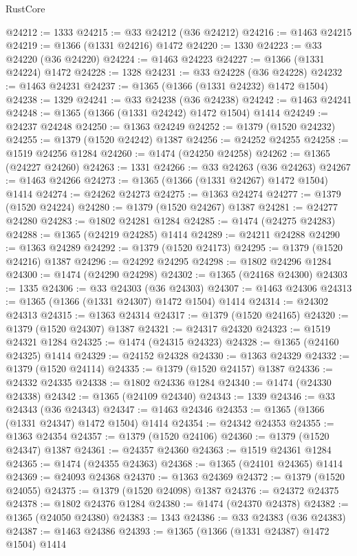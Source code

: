 \begin{lexlean}{RustCore}
\begin{coremodule}
@24212 := 1333
@24215 := @33 @24212 (@36 @24212)
@24216 := @1463 @24215
@24219 := @1366 (@1331 @24216) @1472
@24220 := 1330
@24223 := @33 @24220 (@36 @24220)
@24224 := @1463 @24223
@24227 := @1366 (@1331 @24224) @1472
@24228 := 1328
@24231 := @33 @24228 (@36 @24228)
@24232 := @1463 @24231
@24237 := @1365 (@1366 (@1331 @24232) @1472 @1504)
@24238 := 1329
@24241 := @33 @24238 (@36 @24238)
@24242 := @1463 @24241
@24248 := @1365 (@1366 (@1331 @24242) @1472 @1504) @1414
@24249 := @24237 @24248
@24250 := @1363 @24249
@24252 := @1379 (@1520 @24232)
@24255 := @1379 (@1520 @24242) @1387
@24256 := @24252 @24255
@24258 := @1519 @24256 @1284
@24260 := @1474 (@24250 @24258)
@24262 := @1365 (@24227 @24260)
@24263 := 1331
@24266 := @33 @24263 (@36 @24263)
@24267 := @1463 @24266
@24273 := @1365 (@1366 (@1331 @24267) @1472 @1504) @1414
@24274 := @24262 @24273
@24275 := @1363 @24274
@24277 := @1379 (@1520 @24224)
@24280 := @1379 (@1520 @24267) @1387
@24281 := @24277 @24280
@24283 := @1802 @24281 @1284
@24285 := @1474 (@24275 @24283)
@24288 := @1365 (@24219 @24285) @1414
@24289 := @24211 @24288
@24290 := @1363 @24289
@24292 := @1379 (@1520 @24173)
@24295 := @1379 (@1520 @24216) @1387
@24296 := @24292 @24295
@24298 := @1802 @24296 @1284
@24300 := @1474 (@24290 @24298)
@24302 := @1365 (@24168 @24300)
@24303 := 1335
@24306 := @33 @24303 (@36 @24303)
@24307 := @1463 @24306
@24313 := @1365 (@1366 (@1331 @24307) @1472 @1504) @1414
@24314 := @24302 @24313
@24315 := @1363 @24314
@24317 := @1379 (@1520 @24165)
@24320 := @1379 (@1520 @24307) @1387
@24321 := @24317 @24320
@24323 := @1519 @24321 @1284
@24325 := @1474 (@24315 @24323)
@24328 := @1365 (@24160 @24325) @1414
@24329 := @24152 @24328
@24330 := @1363 @24329
@24332 := @1379 (@1520 @24114)
@24335 := @1379 (@1520 @24157) @1387
@24336 := @24332 @24335
@24338 := @1802 @24336 @1284
@24340 := @1474 (@24330 @24338)
@24342 := @1365 (@24109 @24340)
@24343 := 1339
@24346 := @33 @24343 (@36 @24343)
@24347 := @1463 @24346
@24353 := @1365 (@1366 (@1331 @24347) @1472 @1504) @1414
@24354 := @24342 @24353
@24355 := @1363 @24354
@24357 := @1379 (@1520 @24106)
@24360 := @1379 (@1520 @24347) @1387
@24361 := @24357 @24360
@24363 := @1519 @24361 @1284
@24365 := @1474 (@24355 @24363)
@24368 := @1365 (@24101 @24365) @1414
@24369 := @24093 @24368
@24370 := @1363 @24369
@24372 := @1379 (@1520 @24055)
@24375 := @1379 (@1520 @24098) @1387
@24376 := @24372 @24375
@24378 := @1802 @24376 @1284
@24380 := @1474 (@24370 @24378)
@24382 := @1365 (@24050 @24380)
@24383 := 1343
@24386 := @33 @24383 (@36 @24383)
@24387 := @1463 @24386
@24393 := @1365 (@1366 (@1331 @24387) @1472 @1504) @1414

\end{coremodule}
\end{lexlean}
